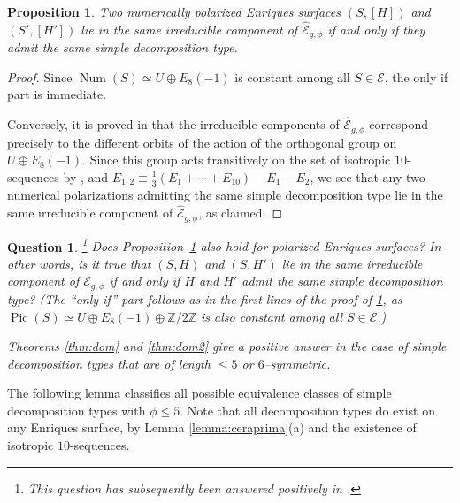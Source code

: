 \documentclass[11pt]{amsart}
\newtheorem{proposition}[thm]{Proposition}
\newtheorem{question}[thm]{Question}
\theoremstyle{definition}
\def\ZZ{{\mathbb Z}}
\def\E{{\mathcal E}}
\def\cong{\simeq}
\def\+{\oplus}               %
\def\Pic{\operatorname{Pic}}
\def\Num{\operatorname{Num}}
\begin{document}
\begin{proposition} \label{prop:desccomp}
  Two numerically polarized Enriques surfaces $(S,[H])$ and  $(S',[H'])$  lie in the same  irreducible  component of $\widehat{\E}_{g,\phi}$ if and only if  they admit the same  simple decomposition type.
\end{proposition}

\begin{proof}
   Since $\Num(S) \cong U \+ E_8(-1)$  is constant among all $S \in \E$, the only if part is immediate.

Conversely, it is proved in \cite{GrHu} that the  irreducible  components of $\widehat{\E}_{g,\phi}$ correspond precisely to the different orbits of the action of the orthogonal group on $U \+ E_8(-1)$. Since this group acts transitively on the set of isotropic $10$-sequences by \cite[Lemma 2.5.2]{cd}, and  $E_{1,2} \equiv \frac{1}{3}(E_1+\cdots+E_{10})-E_1-E_2$,  we see that any two numerical polarizations  admitting the same  simple decomposition type lie in the same  irreducible  component of $\widehat{\E}_{g,\phi}$, as claimed.
\end{proof}

\begin{question}\footnote{This question has subsequently been answered positively in  \cite[Thm.~1.1]{kn-JMPA}.}
 \label{q:desccomp}
  Does Proposition~\ref{prop:desccomp} also hold for polarized
Enriques surfaces? In other words, is it true that $(S,H)$ and $(S,H')$ lie
in the same irreducible component of $\E_{g,\phi}$ if and only if $H$
and $H'$ admit the same simple decomposition type?  (The ``only if''
part follows as in the first lines of the proof of
\ref{prop:desccomp}, as $\Pic(S) \cong U \+ E_8(-1)\+ \ZZ/2\ZZ$ is
also constant among all $S \in \E$.)

Theorems \ref{thm:dom} and \ref{thm:dom2} give a positive answer in the case of simple decomposition types \color{black} that are \color{black} of length $\leqslant 5$ or  $6$--symmetric.  
\end{question}


The following lemma classifies all possible   equivalence classes of  simple  decomposition types with $\phi \leqslant 5$. Note that all decomposition types do exist on any Enriques surface, by Lemma \ref{lemma:ceraprima}(a) and the existence of isotropic $10$-sequences.
\end{document}
